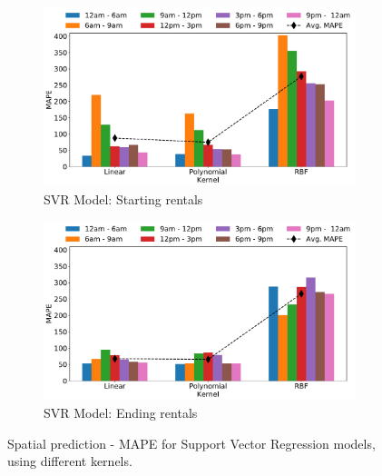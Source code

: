 \begin{figure}
    \begin{center}  
        \begin{subfigure}{0.65\textwidth}
            \includegraphics[width=\columnwidth]{figures/spatial_analyses/MAE_hist_svr_start_err_mean_perc.pdf}
            \caption{SVR Model: Starting rentals
            \vspace{0.5cm}}
            \label{fig:8_5_svr_start_MAPE}
        \end{subfigure}
         \begin{subfigure}{0.65\textwidth}
             \includegraphics[width=\columnwidth]{figures/spatial_analyses/MAE_hist_svr_final_err_mean_perc.pdf}
             \caption{SVR Model:  Ending rentals}
             \label{fig:8_5_svr_final_MAPE}
         \end{subfigure}
 	\caption{Spatial prediction - MAPE for Support Vector Regression models, using different kernels.}
    \label{fig:8_5_reg_MAPE}
    \end{center}
\end{figure}


